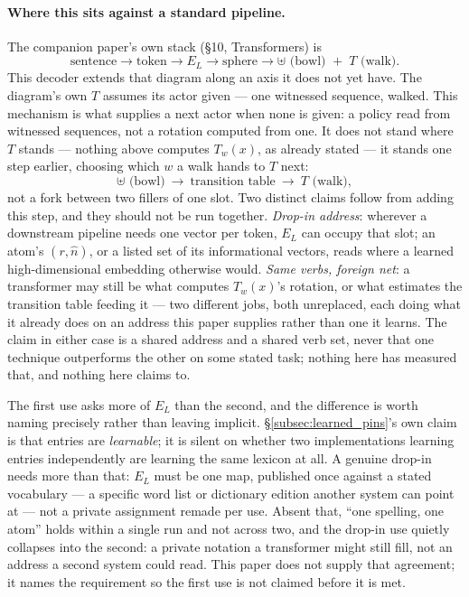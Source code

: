 \documentclass[12pt, a4paper]{article}
\begin{document}
\paragraph{Where this sits against a standard pipeline.} The
companion paper's own stack (\S10, Transformers) is
\[
\text{sentence}\to\text{token}\to E_L\to\text{sphere}\to
\uplus\text{ (bowl) }+\;T\text{ (walk)}.
\]
This decoder extends that diagram along an axis it does not yet
have. The diagram's own $T$ assumes its actor given --- one
witnessed sequence, walked. This mechanism is what supplies a next
actor when none is given: a policy read from witnessed sequences,
not a rotation computed from one. It does not stand where $T$
stands --- nothing above computes $T_w(x)$, as already stated ---
it stands one step earlier, choosing which $w$ a
walk hands to $T$ next:
\[
\uplus\text{ (bowl)}\ \to\ \text{transition table}\ \to\ T\text{ (walk)},
\]
not a fork between two fillers of one slot. Two distinct claims
follow from adding this step, and they should not be run together.
\emph{Drop-in address}: wherever a downstream pipeline needs one
vector per token, $E_L$ can occupy that slot; an atom's $(r,\hat
n)$, or a listed set of its informational vectors, reads where a learned
high-dimensional embedding otherwise would. \emph{Same verbs,
foreign net}: a transformer may still be what computes $T_w(x)$'s
rotation, or what estimates the transition table feeding it --- two
different jobs, both unreplaced, each doing what it already does on
an address this paper supplies rather than one it learns. The claim
in either case is a shared address and a shared verb set, never that
one technique outperforms the other on some stated task; nothing
here has measured that, and nothing here claims to.

The first use asks more of $E_L$ than the second, and the difference
is worth naming precisely rather than leaving implicit.
\S\ref{subsec:learned_pins}'s own claim is that entries are
\emph{learnable}; it is silent on whether two implementations
learning entries independently are learning the same lexicon at all.
A genuine drop-in needs more than that: $E_L$ must be one map,
published once against a stated vocabulary --- a specific word list
or dictionary edition another system can point at --- not a private
assignment remade per use. Absent that, ``one spelling, one atom''
holds within a single run and not across two, and the drop-in use
quietly collapses into the second: a private notation a transformer
might still fill, not an address a second system could read. This
paper does not supply that agreement; it names the requirement so
the first use is not claimed before it is met.
\end{document}
